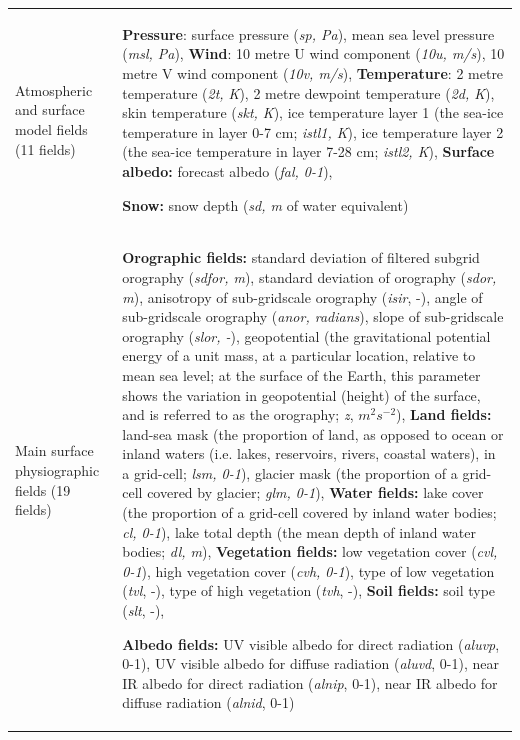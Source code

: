 \documentclass[hess, twostagejnl]{copernicus}
\providecommand{\DIFadd}[1]{{\protect\color{blue} \sf #1}} %
\providecommand{\DIFaddFL}[1]{\DIFadd{#1}} %
\begin{document}
\begin{table}
	\begin{tabularx}{\textwidth}{lX}
		\hline
		\DIFaddFL{Atmospheric and surface model fields (11 fields)
		     }& \DIFaddFL{\textbf{Pressure}: surface pressure (\textit{sp, Pa}), mean sea level pressure (\textit{msl, Pa}), }\newline 
		\DIFaddFL{\textbf{Wind}: 10 metre U wind component (\textit{10u, m/s}), 10 metre V wind component (\textit{10v, m/s}), }\newline 
		\DIFaddFL{\textbf{Temperature}: 2 metre temperature (\textit{2t, K}), 2 metre dewpoint temperature (\textit{2d, K}), skin temperature (\textit{skt, K}), ice temperature layer 1 (the sea-ice temperature in layer 0-7 cm; \textit{istl1, K}), ice temperature layer 2 (the sea-ice temperature in layer 7-28 cm; \textit{istl2, K}), }\newline 
		\DIFaddFL{\textbf{Surface albedo:} forecast albedo (\textit{fal, 0-1}), }\newline 
	\DIFaddFL{\textbf{Snow:} snow depth (\textit{sd, m} of water equivalent)
		
}

		\\
		\DIFaddFL{Main surface physiographic fields
		(19 fields)          }& \DIFaddFL{\textbf{Orographic fields:} standard deviation of filtered subgrid orography (\textit{sdfor, m}), standard deviation of orography (\textit{sdor, m}), anisotropy of sub-gridscale orography (\textit{isir}, -), angle of sub-gridscale orography (\textit{anor, radians}), slope of sub-gridscale orography (\textit{slor, -}), geopotential (the gravitational potential energy of a unit mass, at a particular location, relative to mean sea level; at the surface of the Earth, this parameter shows the variation in geopotential (height) of the surface, and is referred to as the orography; \textit{z}, $m^{2} s^{-2}$), }\newline  
		\DIFaddFL{\textbf{Land fields:} land-sea mask (the proportion of land, as opposed to ocean or inland waters (i.e. lakes, reservoirs, rivers, coastal waters), in a grid-cell; \textit{lsm, 0-1}), glacier mask (the proportion of a grid-cell covered by glacier; \textit{glm, 0-1}), }\newline 
		\DIFaddFL{\textbf{Water fields:} lake cover (the proportion of a grid-cell covered by inland water bodies; \textit{cl, 0-1}), lake total depth (the mean depth of inland water bodies; \textit{dl, m}), }\newline 
		\DIFaddFL{\textbf{Vegetation fields:} low vegetation cover (\textit{cvl, 0-1}), high vegetation cover (\textit{cvh, 0-1}), type of low vegetation (\textit{tvl}, -), type of high vegetation (\textit{tvh}, -), }\newline 
		\DIFaddFL{\textbf{Soil fields:} soil type (\textit{slt}, -), }\newline 
		\DIFaddFL{\textbf{Albedo fields:} UV visible albedo for direct radiation (\textit{aluvp}, 0-1), UV visible albedo for diffuse radiation (\textit{aluvd}, 0-1), near IR albedo for direct radiation (\textit{alnip}, 0-1), near IR albedo for diffuse radiation (\textit{alnid}, 0-1)
		
}
\end{tabularx}
\end{table}
\end{document}

